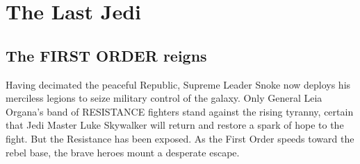 \chapter{The Last Jedi}
\section{The FIRST ORDER reigns}
Having decimated the peaceful Republic, Supreme Leader Snoke 
now deploys his merciless legions to seize military control 
of the galaxy. Only General Leia Organa's band of RESISTANCE 
fighters stand against the rising tyranny, certain that Jedi 
Master Luke Skywalker will return and restore a spark of hope 
to the fight. But the Resistance has been exposed. As the 
First Order speeds toward the rebel base, the brave heroes 
mount a desperate escape.
\lipsum[1-10]
\cite{RAGHUNATH_2018}
\cite{VOGT_2007}
